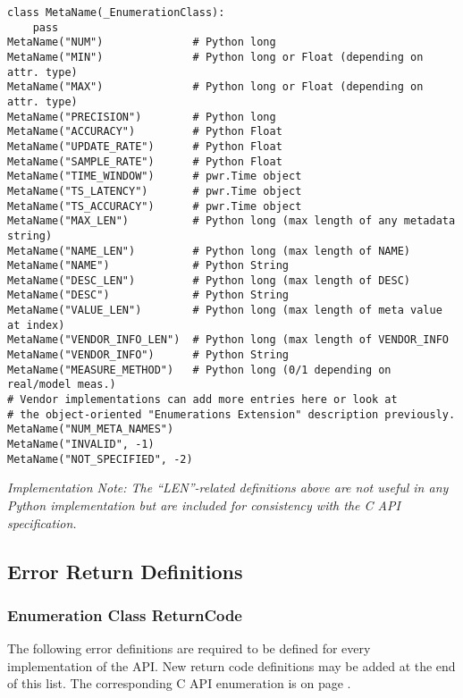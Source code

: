 \documentclass[12pt]{report} %
\begin{document}
\begin{appendices}
\begin{center}\begin{minipage}{.95\linewidth}\begin{lstlisting}
class MetaName(_EnumerationClass):
    pass
MetaName("NUM")              # Python long
MetaName("MIN")              # Python long or Float (depending on attr. type)
MetaName("MAX")              # Python long or Float (depending on attr. type)
MetaName("PRECISION")        # Python long
MetaName("ACCURACY")         # Python Float
MetaName("UPDATE_RATE")      # Python Float
MetaName("SAMPLE_RATE")      # Python Float
MetaName("TIME_WINDOW")      # pwr.Time object
MetaName("TS_LATENCY")       # pwr.Time object
MetaName("TS_ACCURACY")      # pwr.Time object
MetaName("MAX_LEN")          # Python long (max length of any metadata string)
MetaName("NAME_LEN")         # Python long (max length of NAME)
MetaName("NAME")             # Python String
MetaName("DESC_LEN")         # Python long (max length of DESC)
MetaName("DESC")             # Python String
MetaName("VALUE_LEN")        # Python long (max length of meta value at index)
MetaName("VENDOR_INFO_LEN")  # Python long (max length of VENDOR_INFO
MetaName("VENDOR_INFO")      # Python String
MetaName("MEASURE_METHOD")   # Python long (0/1 depending on real/model meas.)
# Vendor implementations can add more entries here or look at  
# the object-oriented "Enumerations Extension" description previously. 
MetaName("NUM_META_NAMES")
MetaName("INVALID", -1)
MetaName("NOT_SPECIFIED", -2)
\end{lstlisting}\end{minipage}\end{center}

\emph{Implementation Note: The ``LEN''-related definitions above are not
useful in any Python implementation but are included for consistency with the C API specification.}

\subsection{Error Return Definitions}\label{sec:PythonErrorReturnDefinition}

\subsubsection{Enumeration Class ReturnCode}\label{class:ReturnCode}

The following error definitions are required to be defined for every
implementation of the API. New return code definitions may be added at the end
of this list. The corresponding C API enumeration is on page
\pageref{sec:ErrorReturnDefinitions}.


\end{appendices}
\end{document}
